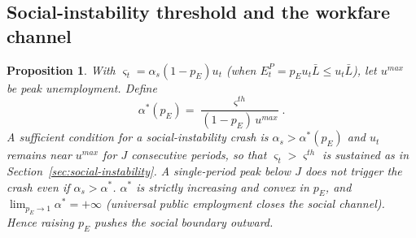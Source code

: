 \documentclass[review,12pt]{elsarticle}
\theoremstyle{plain}
\newtheorem{proposition}[theorem]{Proposition}
\theoremstyle{definition}
\theoremstyle{remark}
\newcommand{\barL}{\bar{L}}
\begin{document}
\subsection{Social-instability threshold and the workfare channel}
\begin{proposition}
\label{prop5}
With $\varsigma_t=\alpha_s(1-p_E)u_t$ (when $E_t^P=p_E u_t\barL\le u_t\barL$), let $u^{max}$ be peak unemployment. Define
\[
\alpha^*(p_E)=\frac{\varsigma^{th}}{(1-p_E)\,u^{max}}.
\]
A sufficient condition for a social-instability crash is $\alpha_s>\alpha^*(p_E)$ \emph{and} $u_t$ remains near $u^{max}$ for $J$ consecutive periods, so that $\varsigma_t>\varsigma^{th}$ is sustained as in Section~\ref{sec:social-instability}. A single-period peak below $J$ does not trigger the crash even if $\alpha_s>\alpha^*$. $\alpha^*$ is strictly increasing and convex in $p_E$, and $\lim_{p_E\to1}\alpha^*=+\infty$ (universal public employment closes the social channel). Hence raising $p_E$ pushes the social boundary outward.
\end{proposition}
\end{document}
